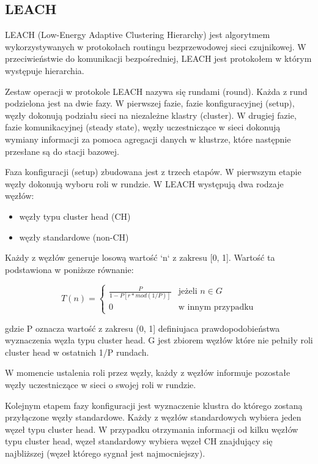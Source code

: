 \documentclass[a4paper,12pt,twoside,openany]{report}
\begin{document}
\subsection{LEACH}

LEACH (Low-Energy Adaptive Clustering Hierarchy) jest algorytmem wykorzystywanych w protokołach routingu bezprzewodowej sieci czujnikowej.
W przeciwieństwie do komunikacji bezpośredniej, LEACH jest protokołem w którym występuje hierarchia. 

Zestaw operacji w protokole LEACH nazywa się rundami (round). Każda z rund podzielona jest na dwie fazy.
W pierwszej fazie, fazie konfiguracyjnej (setup), węzły dokonują podziału sieci na niezależne klastry (cluster).
W drugiej fazie, fazie komunikacyjnej (steady state), węzły uczestniczące w sieci dokonują wymiany informacji za pomoca agregacji danych w klustrze, które następnie
przesłane są do stacji bazowej.

Faza konfiguracji (setup) zbudowana jest z trzech etapów.
W pierwszym etapie węzły dokonują wyboru roli w rundzie. W LEACH występują dwa rodzaje węzłów:

\begin{itemize}
 \item węzły typu cluster head (CH)
 \item węzły standardowe (non-CH)
\end{itemize}

Każdy z węzłów generuje losową wartość `n` z zakresu [0, 1]. Wartość ta podstawiona w poniższe równanie:

\[
T(n) = \begin{cases}
\frac{P}{1 - P[r * mod(1/P)]} & \text{jeżeli } n \in G\\
0 & \text{w innym przypadku}
\end{cases}
\]

gdzie P oznacza wartość z zakresu (0, 1] definiujaca prawdopodobieństwa wyznaczenia węzła typu cluster head.
G jest zbiorem węzłów które nie pełniły roli cluster head w ostatnich 1/P rundach.

W momencie ustalenia roli przez węzły, każdy z węzłów informuje pozostałe węzły uczestniczące w sieci o swojej roli w rundzie.

Kolejnym etapem fazy konfiguracji jest wyznaczenie klustra do którego zostaną przyłączone węzły standardowe.
Każdy z węzłów standardowych wybiera jeden węzeł typu cluster head. W przypadku otrzymania informacji od kilku węzłów typu cluster head,
węzeł standardowy wybiera węzeł CH znajdujący się najbliższej (węzeł którego sygnał jest najmocniejszy).
\end{document}
